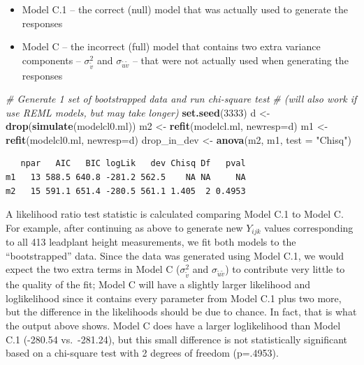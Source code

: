 \documentclass[
]{krantz}
\newenvironment{Shaded}{\begin{snugshade}}{\end{snugshade}}
\newcommand{\CommentTok}[1]{\textcolor[rgb]{0.37,0.37,0.37}{\textit{#1}}}
\newcommand{\DataTypeTok}[1]{\textcolor[rgb]{0.27,0.27,0.27}{#1}}
\newcommand{\DecValTok}[1]{\textcolor[rgb]{0.06,0.06,0.06}{#1}}
\newcommand{\KeywordTok}[1]{\textcolor[rgb]{0.27,0.27,0.27}{\textbf{#1}}}
\newcommand{\NormalTok}[1]{#1}
\newcommand{\StringTok}[1]{\textcolor[rgb]{0.5,0.5,0.5}{#1}}
\providecommand{\tightlist}{%
  \setlength{\itemsep}{0pt}\setlength{\parskip}{0pt}}
\begin{document}
\begin{itemize}
\tightlist
\item
  Model C.1 -- the correct (null) model that was actually used to generate the responses
\item
  Model C -- the incorrect (full) model that contains two extra variance components -- \(\sigma_{\tilde{v}}^{2}\) and \(\sigma_{\tilde{u}\tilde{v}}\) -- that were not actually used when generating the responses
\end{itemize}

\begin{Shaded}
\begin{Highlighting}[]
\CommentTok{# Generate 1 set of bootstrapped data and run chi-square test}
\CommentTok{#  (will also work if use REML models, but may take longer)}
\KeywordTok{set.seed}\NormalTok{(}\DecValTok{3333}\NormalTok{)}
\NormalTok{d <-}\StringTok{ }\KeywordTok{drop}\NormalTok{(}\KeywordTok{simulate}\NormalTok{(modelcl0.ml))}
\NormalTok{m2 <-}\StringTok{ }\KeywordTok{refit}\NormalTok{(modelcl.ml, }\DataTypeTok{newresp=}\NormalTok{d)}
\NormalTok{m1 <-}\StringTok{ }\KeywordTok{refit}\NormalTok{(modelcl0.ml, }\DataTypeTok{newresp=}\NormalTok{d)}
\NormalTok{drop_in_dev <-}\StringTok{ }\KeywordTok{anova}\NormalTok{(m2, m1, }\DataTypeTok{test =} \StringTok{"Chisq"}\NormalTok{)}
\end{Highlighting}
\end{Shaded}

\begin{verbatim}
   npar   AIC   BIC logLik   dev Chisq Df   pval
m1   13 588.5 640.8 -281.2 562.5    NA NA     NA
m2   15 591.1 651.4 -280.5 561.1 1.405  2 0.4953
\end{verbatim}

A likelihood ratio test statistic is calculated comparing Model C.1 to Model C. For example, after continuing as above to generate new \(Y_{ijk}\) values corresponding to all 413 leadplant height measurements, we fit both models to the ``bootstrapped'' data. Since the data was generated using Model C.1, we would expect the two extra terms in Model C (\(\sigma^2_{\tilde{v}}\) and \(\sigma_{\tilde{u}\tilde{v}}\)) to contribute very little to the quality of the fit; Model C will have a slightly larger likelihood and loglikelihood since it contains every parameter from Model C.1 plus two more, but the difference in the likelihoods should be due to chance. In fact, that is what the output above shows. Model C does have a larger loglikelihood than Model C.1 (-280.54 vs.~-281.24), but this small difference is not statistically significant based on a chi-square test with 2 degrees of freedom (p=.4953).
\end{document}
